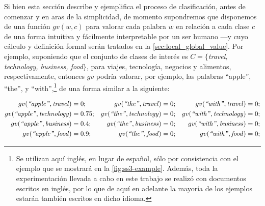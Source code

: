 Si bien esta sección describe y ejemplifica el proceso de clasificación, antes de comenzar y en aras de la simplicidad, de momento supondremos que disponemos de una función $gv(w,c)$ para valorar cada palabra $w$ en relación a cada clase $c$ de una forma intuitiva y fácilmente interpretable por un ser humano ---y cuyo cálculo y definición formal serán tratados en la \autoref{sec:local_global_value}.
Por ejemplo, suponiendo que el conjunto de clases de interés es $C= \{$\emph{travel, technology, business, food}$\}$, para viajes, tecnología, negocios y alimentos, respectivamente, entonces $gv$ podría valorar, por ejemplo, las palabras ``apple'', ``the'', y ``with'',\footnote{Se utilizan aquí inglés, en lugar de español, sólo por consistencia con el ejemplo que se mostrará en la \autoref{fig:ss3-example}. Además, toda la experimentación llevada a cabo en este trabajo se realizó con documentos escritos en inglés, por lo que de aquí en adelante la mayoría de los ejemplos estarán también escritos en dicho idioma.} de una forma similar a la siguiente:

\begin{align*}
gv(\text{\emph{``apple''}}, \text{\emph{travel}})&=0; & gv(\text{\emph{``the''}}, \text{\emph{travel}})&=0; & gv(\text{\emph{``with''}}, \text{\emph{travel}})&=0;\\
gv(\text{\emph{``apple''}}, \text{\emph{technology}})&=0.75; & gv(\text{\emph{``the''}}, \text{\emph{technology}})&=0; & gv(\text{\emph{``with''}}, \text{\emph{technology}})&=0;\\
gv(\text{\emph{``apple''}}, \text{\emph{business}})&=0.4; & gv(\text{\emph{``the''}}, \text{\emph{business}})&=0; & gv(\text{\emph{``with''}}, \text{\emph{business}})&=0;\\
gv(\text{\emph{``apple''}}, \text{\emph{food}})&=0.9;  & gv(\text{\emph{``the''}}, \text{\emph{food}})&=0; & gv(\text{\emph{``with''}}, \text{\emph{food}})&=0;
\end{align*}

